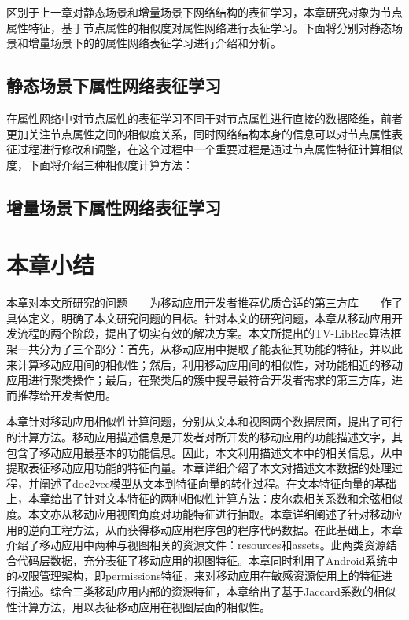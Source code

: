 区别于上一章对静态场景和增量场景下网络结构的表征学习，本章研究对象为节点属性特征，基于节点属性的相似度对属性网络进行表征学习。下面将分别对静态场景和增量场景下的的属性网络表征学习进行介绍和分析。

\subsection{静态场景下属性网络表征学习}
在属性网络中对节点属性的表征学习不同于对节点属性进行直接的数据降维，前者更加关注节点属性之间的相似度关系，同时网络结构本身的信息可以对节点属性表征过程进行修改和调整，在这个过程中一个重要过程是通过节点属性特征计算相似度，下面将介绍三种相似度计算方法：

\subsection{增量场景下属性网络表征学习}
\section{本章小结}
本章对本文所研究的问题——为移动应用开发者推荐优质合适的第三方库——作了具体定义，明确了本文研究问题的目标。针对本文的研究问题，本章从移动应用开发流程的两个阶段，提出了切实有效的解决方案。本文所提出的TV-LibRec算法框架一共分为了三个部分：首先，从移动应用中提取了能表征其功能的特征，并以此来计算移动应用间的相似性；然后，利用移动应用间的相似性，对功能相近的移动应用进行聚类操作；最后，在聚类后的簇中搜寻最符合开发者需求的第三方库，进而推荐给开发者使用。

本章针对移动应用相似性计算问题，分别从文本和视图两个数据层面，提出了可行的计算方法。移动应用描述信息是开发者对所开发的移动应用的功能描述文字，其包含了移动应用最基本的功能信息。因此，本文利用描述文本中的相关信息，从中提取表征移动应用功能的特征向量。本章详细介绍了本文对描述文本数据的处理过程，并阐述了doc2vec模型从文本到特征向量的转化过程。在文本特征向量的基础上，本章给出了针对文本特征的两种相似性计算方法：皮尔森相关系数和余弦相似度。本文亦从移动应用视图角度对功能特征进行抽取。本章详细阐述了针对移动应用的逆向工程方法，从而获得移动应用程序包的程序代码数据。在此基础上，本章介绍了移动应用中两种与视图相关的资源文件：resources和assets。此两类资源结合代码层数据，充分表征了移动应用的视图特征。本章同时利用了Android系统中的权限管理架构，即permissions特征，来对移动应用在敏感资源使用上的特征进行描述。综合三类移动应用内部的资源特征，本章给出了基于Jaccard系数的相似性计算方法，用以表征移动应用在视图层面的相似性。

